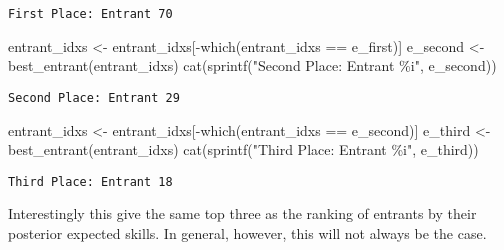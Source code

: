 \documentclass[
  letterpaper,
  DIV=11,
  numbers=noendperiod]{scrartcl}
\newenvironment{Shaded}{\begin{snugshade}}{\end{snugshade}}
\newcommand{\DecValTok}[1]{\textcolor[rgb]{0.68,0.00,0.00}{#1}}
\newcommand{\FunctionTok}[1]{\textcolor[rgb]{0.28,0.35,0.67}{#1}}
\newcommand{\NormalTok}[1]{\textcolor[rgb]{0.00,0.23,0.31}{#1}}
\newcommand{\OtherTok}[1]{\textcolor[rgb]{0.00,0.23,0.31}{#1}}
\newcommand{\SpecialCharTok}[1]{\textcolor[rgb]{0.37,0.37,0.37}{#1}}
\newcommand{\StringTok}[1]{\textcolor[rgb]{0.13,0.47,0.30}{#1}}
\begin{document}
\begin{Shaded}
\end{Shaded}

\begin{verbatim}
First Place: Entrant 70
\end{verbatim}

\begin{Shaded}
\begin{Highlighting}[]
\NormalTok{entrant\_idxs }\OtherTok{\textless{}{-}}\NormalTok{ entrant\_idxs[}\SpecialCharTok{{-}}\FunctionTok{which}\NormalTok{(entrant\_idxs }\SpecialCharTok{==}\NormalTok{ e\_first)]}
\NormalTok{e\_second }\OtherTok{\textless{}{-}} \FunctionTok{best\_entrant}\NormalTok{(entrant\_idxs)}
\FunctionTok{cat}\NormalTok{(}\FunctionTok{sprintf}\NormalTok{(}\StringTok{"Second Place: Entrant \%i"}\NormalTok{, e\_second))}
\end{Highlighting}
\end{Shaded}

\begin{verbatim}
Second Place: Entrant 29
\end{verbatim}

\begin{Shaded}
\begin{Highlighting}[]
\NormalTok{entrant\_idxs }\OtherTok{\textless{}{-}}\NormalTok{ entrant\_idxs[}\SpecialCharTok{{-}}\FunctionTok{which}\NormalTok{(entrant\_idxs }\SpecialCharTok{==}\NormalTok{ e\_second)]}
\NormalTok{e\_third }\OtherTok{\textless{}{-}} \FunctionTok{best\_entrant}\NormalTok{(entrant\_idxs)}
\FunctionTok{cat}\NormalTok{(}\FunctionTok{sprintf}\NormalTok{(}\StringTok{"Third Place: Entrant \%i"}\NormalTok{, e\_third))}
\end{Highlighting}
\end{Shaded}

\begin{verbatim}
Third Place: Entrant 18
\end{verbatim}

Interestingly this give the same top three as the ranking of entrants by
their posterior expected skills. In general, however, this will not
always be the case.
\end{document}

